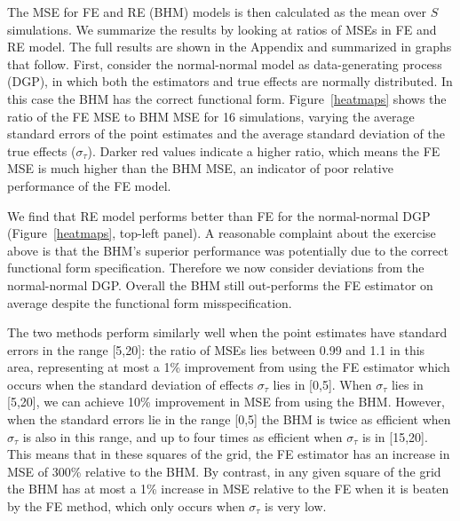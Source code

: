 \documentclass[12pt]{article}
\begin{document}

The MSE for FE and RE (BHM) models is then calculated as the mean over $S$ simulations. We summarize the results by looking at ratios of MSEs in FE and RE model. The full results are shown in the Appendix and summarized in graphs that follow. First, consider the normal-normal model as data-generating process (DGP), in which both the estimators and true effects are normally distributed. In this case the BHM has the correct functional form. Figure~\ref{heatmaps} shows the ratio of the FE MSE to BHM MSE for 16 simulations, varying the average standard errors of the point estimates and the average standard deviation of the true effects ($\sigma_{\tau}$). Darker red values indicate a higher ratio, which means the FE MSE is much higher than the BHM MSE, an indicator of poor relative performance of the FE model.

We find that RE model performs better than FE for the normal-normal DGP (Figure~\ref{heatmaps}, top-left panel). A reasonable complaint about the exercise above is that the BHM's superior performance was potentially due to the correct functional form specification. Therefore we now consider deviations from the normal-normal DGP. Overall the BHM still out-performs the FE estimator on average despite the functional form misspecification.

The two methods perform similarly well when the point estimates have standard errors in the range [5,20]: the ratio of MSEs lies between 0.99 and 1.1 in this area, representing at most a 1\% improvement from using the FE estimator which occurs when the standard deviation of effects $\sigma_{\tau}$ lies in [0,5]. When $\sigma_{\tau}$ lies in [5,20], we can achieve 10\% improvement in MSE from using the BHM. However, when the standard errors lie in the range [0,5] the BHM is twice as efficient when $\sigma_{\tau}$ is also in this range, and up to four times as efficient when $\sigma_{\tau}$ is in [15,20]. This means that in these squares of the grid, the FE estimator has an increase in MSE of 300\% relative to the BHM. By contrast, in any given square of the grid the BHM has at most a 1\% increase in MSE relative to the FE when it is beaten by the FE method, which only occurs when $\sigma_{\tau}$ is very low.
\end{document}
